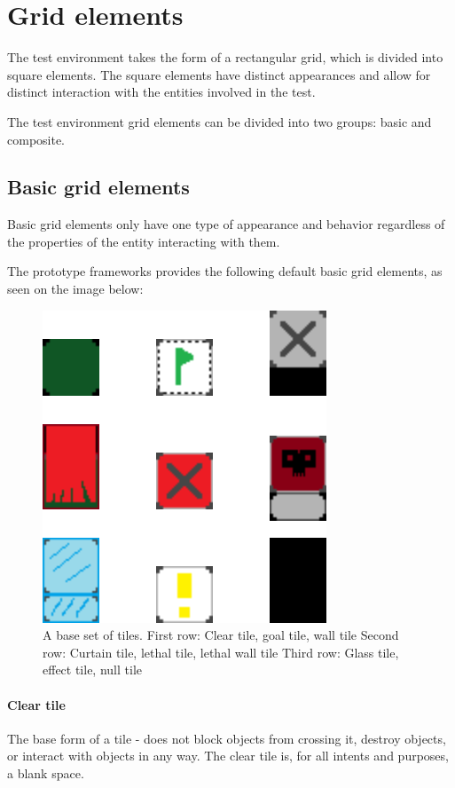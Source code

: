 \documentclass[masterthesis]{fer}
\begin{document}
\section{Grid elements}

The test environment takes the form of a rectangular grid, which is divided into square elements. The square elements have distinct appearances and allow for distinct interaction with the entities involved in the test.

The test environment grid elements can be divided into two groups: basic and composite.

\subsection{Basic grid elements}

Basic grid elements only have one type of appearance and behavior regardless of the properties of the entity interacting with them.

The prototype frameworks provides the following default basic grid elements, as seen on the image below:

\begin{figure}[htb]
  \centering
  \includegraphics[width=0.5\linewidth]{Figures/grid/all_tiles.png} 
  \caption{A base set of tiles.
  First row: Clear tile, goal tile, wall tile
  Second row: Curtain tile, lethal tile, lethal wall tile
  Third row: Glass tile, effect tile, null tile}
  \label{slk:tile_grid_tiles/floor.png}
\end{figure}

\paragraph{Clear tile}

The base form of a tile - does not block objects from crossing it, destroy objects, or interact with objects in any way. The clear tile is, for all intents and purposes, a blank space.
\end{document}
